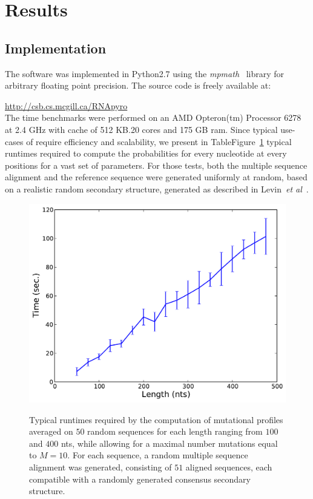 \section{Results}
\label{sec:results}

\subsection{Implementation}
The software was implemented in Python2.7 using the \textit{mpmath}~\cite{mpmath} library
for  arbitrary floating point precision. The source code is freely available at:


{\centering \url{http://csb.cs.mcgill.ca/RNApyro}\\}
The time benchmarks were performed on an AMD Opteron(tm) Processor 6278  at 2.4 GHz with cache of 512 KB.20 cores and 175 GB ram.
Since typical use-cases of \RNApyro require efficiency and scalability, we present in TableFigure~\ref{fig:time}
typical runtimes required to compute the probabilities for  every nucleotide at every positions for a vast set of parameters.
For those tests, both the multiple sequence alignment and the reference sequence were generated uniformly at random,
based on a realistic random secondary structure, generated as described in Levin~\emph{et al}~\cite{Levin:2012kx}.

\begin{figure}[t]
{\centering \includegraphics[width=.5\linewidth]{figures/TimeBenchmark}\\}

\caption{Typical runtimes required by the computation of mutational profiles 
averaged on $50$ random sequences for each length ranging from $100$ and $400$ nts, while allowing for a maximal number mutations equal to $M=10$. 
For each sequence, a random multiple sequence alignment was generated, consisting of $51$ aligned sequences, each compatible with a randomly generated consensus secondary structure. 
}
\label{fig:time}
\end{figure}


